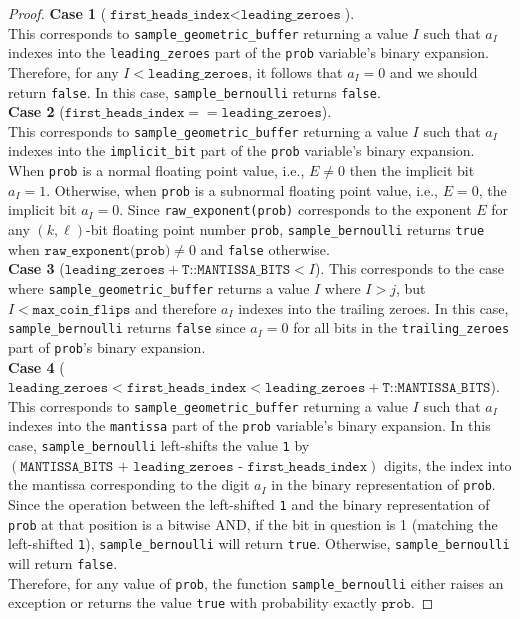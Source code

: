 \documentclass[11pt,a4paper]{article}
\theoremstyle{definition}
\begin{document}
\begin{proof}
\noindent\textbf{Case 1} ($\texttt{first\_heads\_index} < \texttt{leading\_zeroes}$). \\
\noindent This corresponds to \texttt{sample\_geometric\_buffer} returning a value $I$ such that $a_I$ indexes into the \texttt{leading\_zeroes} part of the  \texttt{prob} variable's binary expansion. Therefore, for any $I < \texttt{leading\_zeroes}$, it follows that $a_I = 0$ and we should return \texttt{false}. In this case, \texttt{sample\_bernoulli} returns \texttt{false}.\\

\noindent\textbf{Case 2} ($\texttt{first\_heads\_index} == \texttt{leading\_zeroes}$). \\
\noindent This corresponds to \texttt{sample\_geometric\_buffer} returning a value $I$ such that $a_I$ indexes into the \texttt{implicit\_bit} part of the  \texttt{prob} variable's binary expansion. When \texttt{prob} is a normal floating point value, i.e., $E \ne 0$ then the implicit bit $a_I = 1$. Otherwise, when \texttt{prob} is a subnormal floating point value, i.e., $E = 0$, the implicit bit $a_I = 0$. Since \texttt{raw\_exponent(prob)} corresponds to the exponent $E$ for any $(k,\ell)$-bit floating point number \texttt{prob}, \texttt{sample\_bernoulli} returns \texttt{true} when $\texttt{raw\_exponent(prob)} \ne 0$ and \texttt{false} otherwise. \\


\noindent\textbf{Case 3} ($\texttt{leading\_zeroes}  + \texttt{T::MANTISSA\_BITS} < I$). This corresponds to the case where  \texttt{sample\_geometric\_buffer} returns a value $I$ where $I > j$, but $I < \texttt{max\_coin\_flips}$ and therefore $a_I$ indexes into the trailing zeroes. In this case, \texttt{sample\_bernoulli} returns \texttt{false} since $a_I = 0$ for all bits in the \texttt{trailing\_zeroes} part of \texttt{prob}'s binary expansion. \\

\noindent\textbf{Case 4} ($ \texttt{leading\_zeroes} < \texttt{first\_heads\_index}  <  \texttt{leading\_zeroes}  + \texttt{T::MANTISSA\_BITS}$). \\
\noindent This corresponds to \texttt{sample\_geometric\_buffer} returning a value $I$ such that $a_I$ indexes into the \texttt{mantissa} part of the  \texttt{prob} variable's binary expansion. In this case, 
\texttt{sample\_bernoulli}  left-shifts the value \texttt{1} by  $(\texttt{MANTISSA\_BITS + leading\_zeroes - first\_heads\_index})$ digits, the index into the mantissa corresponding to the digit $a_I$ in the binary representation of \texttt{prob}. Since the operation between the left-shifted \texttt{1} and the binary representation of \texttt{prob} at that position is a bitwise AND, if the bit in question is 1 (matching the left-shifted \texttt{1}), \texttt{sample\_bernoulli} will return \texttt{true}. Otherwise, \texttt{sample\_bernoulli} will return \texttt{false}. \\


\noindent Therefore, for any value of \texttt{prob}, the function \texttt{sample\_bernoulli} either raises an exception or returns the value \texttt{true} with probability exactly $\texttt{prob}$.  
\end{proof}
\end{document}
